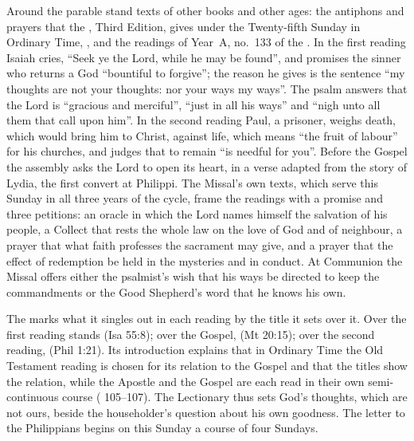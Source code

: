 Around the parable stand texts of other books and other ages: the antiphons
and prayers that the , Third Edition, gives under the
Twenty-fifth Sunday in Ordinary Time, , and
the readings of Year~A, no.~133 of the . In the first
reading Isaiah cries, ``Seek ye the Lord, while he may be found'', and
promises the sinner who returns a God ``bountiful to forgive''; the reason he
gives is the sentence ``my thoughts are not your thoughts: nor your ways my
ways''. The psalm answers that the Lord is ``gracious and
merciful'', ``just in all his ways'' and ``nigh unto all them that call upon
him''. In the second reading Paul, a prisoner, weighs death, which would
bring him to Christ, against life, which means ``the fruit of labour'' for
his churches, and judges that to remain ``is needful for you''. Before the
Gospel the assembly asks the Lord to open its heart, in a verse adapted from
the story of Lydia, the first convert at Philippi. The Missal's own texts,
which serve this Sunday in all three years of the cycle, frame the readings
with a promise and three petitions: an oracle in which the Lord names himself
the salvation of his people, a Collect that rests the whole law on the love of
God and of neighbour, a prayer that what faith professes the sacrament may
give, and a prayer that the effect of redemption be held in the mysteries and
in conduct. At Communion the Missal offers either the psalmist's wish that his
ways be directed to keep the commandments or the Good Shepherd's word that he
knows his own.

The  marks what it singles out in each reading by
the title it sets over it. Over the first reading stands  (Isa 55:8); over the Gospel,  (Mt 20:15); over the second
reading,  (Phil 1:21). Its introduction
explains that in Ordinary Time the Old Testament reading is chosen for its
relation to the Gospel and that the titles show the relation, while the
Apostle and the Gospel are each read in their own semi-continuous course
( 105--107). The Lectionary thus sets God's thoughts, which
are not ours, beside the householder's question about his own goodness. The
letter to the Philippians begins on this Sunday a course of four Sundays.

